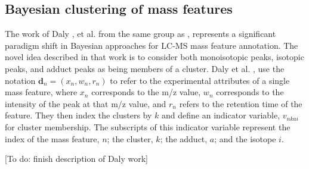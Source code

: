 \begin{DoubleSpace*}
\section{Bayesian clustering of mass features}
The work of Daly \cite{daly2014}, et al. from the same group as \cite{rogers2009}, represents a significant paradigm shift in Bayesian approaches for LC-MS mass feature annotation. The novel idea described in that work is to consider both monoisotopic peaks, isotopic peaks, and adduct peaks as being members of a cluster. Daly et al. \cite{daly2014}, use the notation $\textbf{d}_n = (x_n,w_n,r_n)$ to refer to the experimental attributes of a single mass feature, where $x_n$ corresponds to the m/z value, $w_n$ corresponds to the intensity of the peak at that m/z value, and $r_n$ refers to the retention time of the feature. They then index the clusters by $k$ and define an indicator variable, $v_{nkai}$ for cluster membership. The subscripts of this indicator variable represent the index of the mass feature, $n$; the cluster, $k$; the adduct, $a$; and the isotope $i$. 

[To do: finish description of Daly work]

\end{DoubleSpace*}